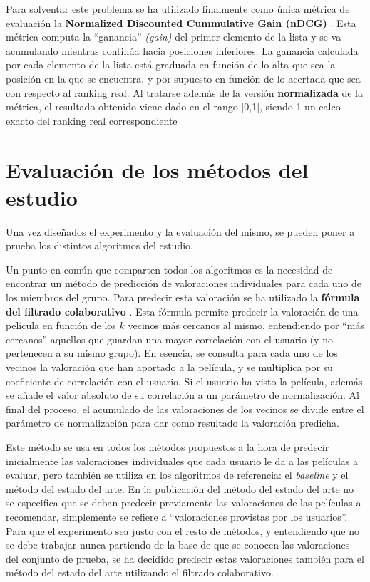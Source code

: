 Para solventar este problema se ha utilizado finalmente como única métrica de evaluación la \textbf{Normalized Discounted Cummulative Gain (nDCG)} \cite{ndcg-survey}. Esta métrica computa la ``ganancia'' \textit{(gain)} del primer elemento de la lista y se va acumulando mientras continúa hacia posiciones inferiores. La ganancia calculada por cada elemento de la lista está graduada en función de lo alta que sea la posición en la que se encuentra, y por supuesto en función de lo acertada que sea con respecto al ranking real. Al tratarse además de la versión \textbf{normalizada} de la métrica, el resultado obtenido viene dado en el rango [0,1], siendo 1 un calco exacto del ranking real correspondiente

\section{Evaluación de los métodos del estudio}

Una vez diseñados el experimento y la evaluación del mismo, se pueden poner a prueba los distintos algoritmos del estudio.

Un punto en común que comparten todos los algoritmos es la necesidad de encontrar un método de predicción de valoraciones individuales para cada uno de los miembros del grupo. Para predecir esta valoración se ha utilizado la \textbf{fórmula del filtrado colaborativo} \cite{recuperacion-informacion}. Esta fórmula permite predecir la valoración de una película en función de los $k$ vecinos más cercanos al mismo, entendiendo por ``más cercanos'' aquellos que guardan una mayor correlación con el usuario (y no pertenecen a su mismo grupo). En esencia, se consulta para cada uno de los vecinos la valoración que han aportado a la película, y se multiplica por su coeficiente de correlación con el usuario. Si el usuario ha visto la película, además se añade el valor absoluto de su correlación a un parámetro de normalización. Al final del proceso, el acumulado de las valoraciones de los vecinos se divide entre el parámetro de normalización para dar como resultado la valoración predicha.

Este método se usa en todos los métodos propuestos a la hora de predecir inicialmente las valoraciones individuales que cada usuario le da a las películas a evaluar, pero también se utiliza en los algoritmos de referencia: el \textit{baseline} y el método del estado del arte. En la publicación del método del estado del arte \cite{pogrs} no se especifica que se deban predecir previamente las valoraciones de las películas a recomendar, simplemente se refiere a ``valoraciones provistas por los usuarios''. Para que el experimento sea justo con el resto de métodos, y entendiendo que no se debe trabajar nunca partiendo de la base de que se conocen las valoraciones del conjunto de prueba, se ha decidido predecir estas valoraciones también para el método del estado del arte utilizando el filtrado colaborativo.

